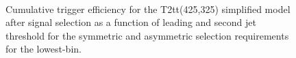 \begin{figure}[h!]
  \begin{center}
     ~~
     \\
    \caption{
Cumulative trigger efficiency for the T2tt(425,325) simplified model after signal selection as a function of leading and second jet threshold for the symmetric and asymmetric selection requirements for the lowest-\scalht bin.}
    \label{fig:T1ttt_Trigger_Efficiency_DijetAve}
  \end{center} 
\end{figure}
